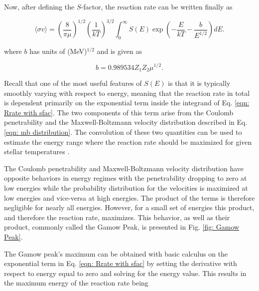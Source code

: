 Now, after defining the $S$-factor, the reaction rate can be written finally as 

\begin{equation}
\langle \sigma v \rangle = \left( \frac{8}{\pi \mu} \right) ^{1/2} \left( \frac{1}{kT} \right) ^{3/2} \int_{0}^{\infty} S (E) \exp \left(-\dfrac{E}{kT} - \dfrac{b}{E^{1/2}}\right) dE.
\label{eqn: Rrate with sfac}
\end{equation}

\noindent where $b$ has units of (MeV)$^{1/2}$ and is given as

\begin{equation}
b = 0.989534 Z_{1} Z_{2} \mu^{1/2}. 
\end{equation}

\noindent Recall that one of the most useful features of $S(E)$ is that it is typically smoothly varying with respect to energy, meaning that the reaction rate in total is dependent primarily on the exponential term inside the integrand of Eq. \ref{eqn: Rrate with sfac}. The two components of this term arise from the Coulomb penetrability and the Maxwell-Boltzmann velocity distribution described in Eq. \ref{eqn: mb distribution}. The convolution of these two quantities can be used to estimate the energy range where the reaction rate should be maximized for given stellar temperatures \cite{IliadisBook}. 

The Coulomb penetrability and Maxwell-Boltzmann velocity distribution have opposite behaviors in energy regimes with the penetrability dropping to zero at low energies while the probability distribution for the velocities is maximized at low energies and vice-versa at high energies. The product of the terms is therefore negligible for nearly all energies. However, for a small set of energies this product, and therefore the reaction rate, maximizes. This behavior, as well as their product, commonly called the Gamow Peak, is presented in Fig. \ref{fig: Gamow Peak}. 

The Gamow peak's maximum can be obtained with basic calculus on the exponential term in Eq. \ref{eqn: Rrate with sfac} by setting the derivative with respect to energy equal to zero and solving for the energy value. This results in the maximum energy of the reaction rate being 

